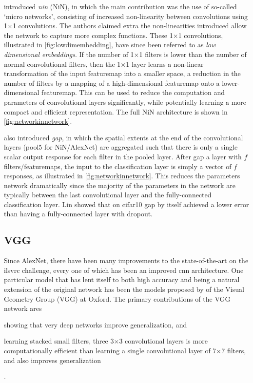 \documentclass[thesis]{subfiles}
\begin{document}
\citet{Lin2013NiN} introduced \emph{\gls{nin}} (NiN), in which the main contribution was the use of so-called `micro networks', consisting of increased non-linearity between convolutions using 1$\times$1 convolutions. The authors claimed extra the non-linearities introduced allow the network to capture more complex functions. These 1$\times $1 convolutions, illustrated in \cref{fig:lowdimembedding}, have since been referred to as \emph{low dimensional embeddings}. If the number of 1$\times$1 filters is lower than the number of normal convolutional filters, then the 1$\times$1 layer learns a non-linear transformation of the input \gls{featuremap} into a smaller space, \ie a reduction in the number of filters by a mapping of a high-dimensional \gls{featuremap} onto a lower-dimensional \gls{featuremap}. This can be used to reduce the computation and parameters of convolutional layers significantly, while potentially learning a more compact and efficient representation. The full NiN architecture is shown in \cref{fig:networkinnetwork}.

\citet{Lin2013NiN} also introduced \emph{\gls{gap}}, in which the spatial extents at the end of the convolutional layers (\ie pool5 for NiN/AlexNet) are aggregated such that there is only a single scalar output response for each filter in the pooled layer. After \gls{gap} a layer with $f$ filters/\glspl{featuremap}, the input to the classification layer is simply a vector of $f$ responses, as illustrated in \cref{fig:networkinnetwork}. This reduces the parameters network dramatically since the majority of the parameters in the network are typically between the last convolutional layer and the fully-connected classification layer. Lin \etal showed that on \gls{cifar10} \gls{gap} by itself achieved a lower error than having a fully-connected layer with dropout.

\subsection{VGG}
Since AlexNet, there have been many improvements to the state-of-the-art on the \gls{ilsvrc} challenge, every one of which has been an improved \gls{cnn} architecture. One particular model that has lent itself to both high accuracy and being a natural extension of the original network has been the models proposed by \citet{Simonyan2014verydeep} of the Visual Geometry Group (VGG) at Oxford. The primary contributions of the VGG network ares
\begin{enumerate*}[label = (\textbf{\roman*})]
\item showing that very deep networks improve generalization, and
\item learning stacked small filters, \ie three 3$\times$3 convolutional layers is more computationally efficient than learning a single convolutional layer of 7$\times$7 filters, and also improves generalization
\end{enumerate*}.
\end{document}
